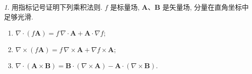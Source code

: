 \documentclass[11pt]{article}
\theoremstyle{remark}
\newtheorem{problem}{}
\begin{document}

   

  



\begin{problem}
  用指标记号证明下列乘积法则. $f$ 是标量场, $\mathbf{A}$、$\mathbf{B}$ 是矢量场, 分量在直角坐标中足够光滑.
  \begin{enumerate}
    \item $\displaystyle
      \nabla\cdot(f\mathbf{A})
      =f\,\nabla\cdot\mathbf{A}+\mathbf{A}\cdot\nabla f$;
    \item $\displaystyle
      \nabla\times(f\mathbf{A})
      =f\,\nabla\times\mathbf{A}+\nabla f\times\mathbf{A}$;
    \item $\displaystyle
      \nabla\cdot(\mathbf{A}\times\mathbf{B})
      =\mathbf{B}\cdot(\nabla\times\mathbf{A})
       -\mathbf{A}\cdot(\nabla\times\mathbf{B})$.
  \end{enumerate}
\end{problem}

\vspace{1.6em}
\end{document}
